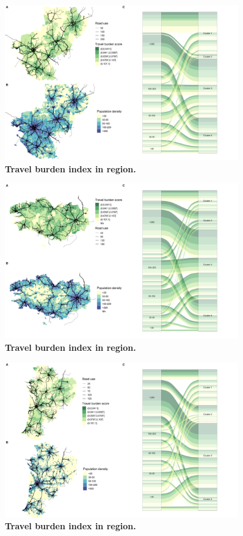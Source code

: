\begin{figure}[H]
    \includegraphics[width=0.9\textwidth]{images/routes/fig4_52.png}
    \centering
    \caption{
        \textbf{Travel burden index in region.}
    }
\end{figure}

\begin{figure}[H]
    \includegraphics[width=0.9\textwidth]{images/routes/fig4_53.png}
    \centering
    \caption{
        \textbf{Travel burden index in region.}
    }
\end{figure}

\begin{figure}[H]
    \includegraphics[width=0.9\textwidth]{images/routes/fig4_75.png}
    \centering
    \caption{
        \textbf{Travel burden index in region.}
    }
\end{figure}

